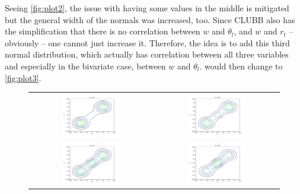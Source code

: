 Seeing \cref{fig:plot2},
the issue with having some values in the middle is mitigated
but the general width of the normals was increased, too.
Since \gls{CLUBB} also has the simplification
that there is no correlation between $w$ and $\theta_l$,
and $w$ and $r_t$ -- obviously -- one cannot just increase it.
Therefore, the idea is to add this third normal distribution,
which actually has correlation between all three variables
and especially in the bivariate case, between $w$ and $\theta_l$.
 would then change to \cref{fig:plot3}.
\begin{figure}[!htb]
    \centering
    \begin{tabular}{cc}
        \multicolumn{1}{c}{\includegraphics[width=0.48\textwidth]{include/figures/plot3_1}} &
        \multicolumn{1}{c}{\includegraphics[width=0.48\textwidth]{include/figures/plot3_2}} \\
        \multicolumn{1}{c}{\includegraphics[width=0.48\textwidth]{include/figures/plot3_3}} &
        \multicolumn{1}{c}{\includegraphics[width=0.48\textwidth]{include/figures/plot3_4}} \\

\end{tabular}
\end{figure}
